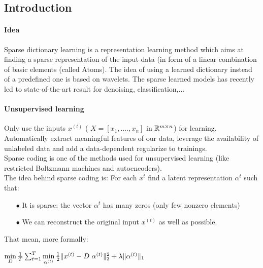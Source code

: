 \subsection{Introduction}
\paragraph{Idea} Sparse dictionary learning is a representation learning method which aims at finding a sparse representation of the input data (in form of a linear combination of basic elements (called Atoms). The idea of using a learned dictionary instead of a predefined one is based on wavelets. The sparse learned models has recently led to state-of-the-art result for denoising, classification,...
\paragraph{Unsupervised learning} Only use the inputs $x^{(t)}$ ( $X = [x_1,....,x_n]$ in $\mathbb{R}^{m \times n}$) for learning. Automatically extract meaningful features of our data, leverage the availability of unlabeled data and add a data-dependent regularize to trainings.\\

Sparse coding is one of the methods used for unsupervised learning  (like restricted Boltzmann machines and autoencoders).\\
The idea behind sparse coding is: For each $x^{t}$ find a latent representation $\alpha^{t}$ such that:
\begin{itemize}
 \item[$\bullet$] It is sparse: the vector $\alpha^{t}$ has many zeros (only few nonzero elements)
 \item[$\bullet$] We can reconstruct the original input $x^{(t)}$ as well as possible.
\end{itemize}
That mean, more formally:\\

\begin{center}
 $\min\limits_{D} \frac{1}{T} \sum_{t=1}^{T}  \min\limits_{\alpha^{(t)}} \frac{1}{2} \| x^{(t)} - D \hspace{3px} \alpha^{(t)} \|_2^2 + \lambda \|\alpha^{(t)} \|_1$\\
\end{center}

